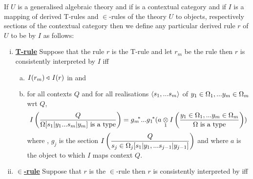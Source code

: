 \begin{definition}
If $U$ is a generalised algebraic theory and if \catcw is a contextual category 
and if $I$ is a  mapping of derived T-rules and $\in$-rules of the theory $U$ to objects, respectively sections of the contextual category \catcw
then we define any particular derived rule $r$ of $U$ to be  by $I$ as follows: \\
\begin{enumerate}[(i)]
\item \underline{\textbf{T-rule}} 
Suppose that  the rule $r$ is the T-rule \omegarule and let $r_m$ be the rule
then $r$ is consistently interpreted by $I$ iff
\begin{enumerate}[(a)] 
\item {} $I(r_m) \base\, I(r)$ in \catcw  and
\item
for all contexts $Q$ and for all realisations $\tuple{\sm}$ of $\yOmega{m}$ wrt $Q$, 
$$ \Imappedrule{Q}{\isT{\Omega[s_1|y_1...s_m|y_m]}} = \gmstar...\gonestar(\crossx{a}{\Imappedrule{\yOmega{m}}{\isT{\Omega}}}{1})$$
where \foreachj, $g_j$ is the section
$\displaystyle\Imappedrule{Q}{\sjconclusion}$ and where $a$ is the object to which $I$ maps context $Q$. 
\end {enumerate}
\item \underline{\textbf{$\boldsymbol {\in}$-rule}} 
Suppose that $r$ is the $\in$-rule \srule then
$r$ is consistently interpreted by iff


\end{enumerate}
\end{definition}
